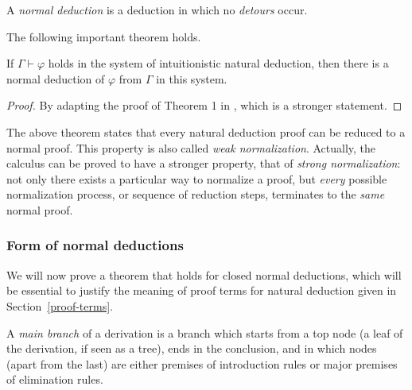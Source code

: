 \begin{definition}
  A \emph{normal deduction} is a deduction in which no \emph{detours} occur.
\end{definition}

The following important theorem holds.

\begin{theorem}
  If $\Gamma \vdash \varphi$ holds in the system of intuitionistic natural
  deduction, then there is a normal deduction of $\varphi$ from $\Gamma$ in this
  system.
\end{theorem}
\begin{proof}
  By adapting the proof of Theorem 1 in \cite{prawitz1965}, which is a stronger
  statement.
\end{proof}

The above theorem states that every natural deduction proof can be reduced to a
normal proof. This property is also called \emph{weak normalization}. Actually,
the calculus can be proved to have a stronger property, that of \emph{strong
  normalization}: not only there exists a particular way to normalize a proof,
but \emph{every} possible normalization process, or sequence of reduction steps,
terminates to the \emph{same} normal proof.

\subsubsection{Form of normal deductions}

We will now prove a theorem that holds for closed normal deductions, which will
be essential to justify the meaning of proof terms for natural deduction given
in Section~\ref{proof-terms}.

\begin{definition}
  A \emph{main branch} of a derivation is a branch which starts from a top node
  (a leaf of the derivation, if seen as a tree), ends in the conclusion, and in
  which nodes (apart from the last) are either premises of introduction rules or
  major premises of elimination rules.
\end{definition}

